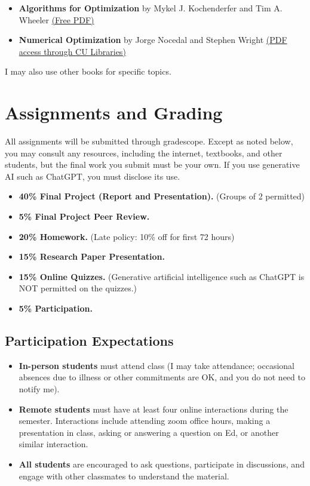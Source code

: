 \documentclass[9pt]{article}
\begin{document}
\begin{itemize}[noitemsep]
    \item \textbf{Algorithms for Optimization} by Mykel J. Kochenderfer and Tim A. Wheeler \href{https://www.algorithmsbook.com/optimization}{(Free PDF)}
    \item \textbf{Numerical Optimization} by Jorge Nocedal and Stephen Wright \href{https://link-springer-com.colorado.idm.oclc.org/book/10.1007/978-0-387-40065-5}{(PDF access through CU Libraries)}
\end{itemize}

I may also use other books for specific topics.

\section*{Assignments and Grading}

All assignments will be submitted through gradescope. Except as noted below, you may consult any resources, including the internet, textbooks, and other students, but the final work you submit must be your own. If you use generative AI such as ChatGPT, you must disclose its use.

\begin{itemize}[noitemsep]
    \item \textbf{40\% Final Project (Report and Presentation).} (Groups of 2 permitted)
    \item \textbf{5\% Final Project Peer Review.}
    \item \textbf{20\% Homework.} (Late policy: 10\% off for first 72 hours)
    \item \textbf{15\% Research Paper Presentation.}
    \item \textbf{15\% Online Quizzes.} (Generative artificial intelligence such as ChatGPT is NOT permitted on the quizzes.)
    \item \textbf{5\% Participation.}
\end{itemize}

\subsection*{Participation Expectations}

\begin{itemize}[noitemsep]
    \item \textbf{In-person students} must attend class (I may take attendance; occasional absences due to illness or other commitments are OK, and you do not need to notify me).
    \item \textbf{Remote students} must have at least four online interactions during the semester. Interactions include attending zoom office hours, making a presentation in class, asking or answering a question on Ed, or another similar interaction.
    \item \textbf{All students} are encouraged to ask questions, participate in discussions, and engage with other classmates to understand the material.
\end{itemize}
\end{document}
